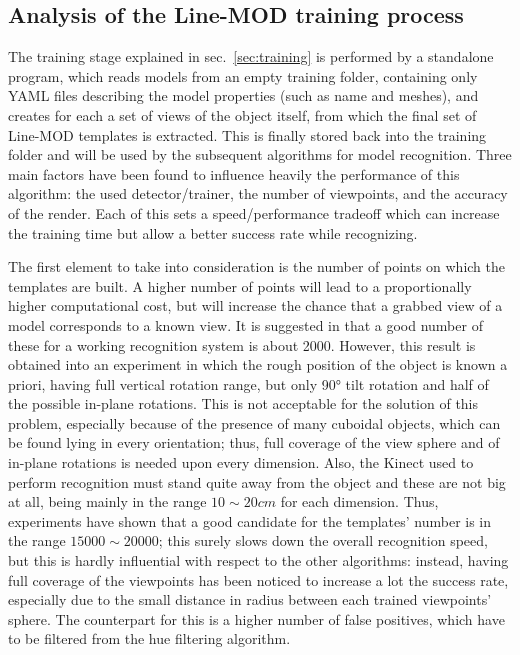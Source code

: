 \subsection{Analysis of the Line-MOD training process}
The training stage explained in sec.~\ref{sec:training} is performed
by a standalone program, which reads models from an empty training
folder, containing only YAML files describing the model properties
(such as name and meshes), and creates for each a set of views of the
object itself, from which the final set of Line-MOD templates is
extracted. This is finally stored back into the training folder and
will be used by the subsequent algorithms for model recognition.
Three main factors have been found to influence heavily the performance of this algorithm: the used
detector/trainer, the number of viewpoints, and the accuracy of the
render. Each of this sets a speed/performance tradeoff which can
increase the training time but allow a better success rate while
recognizing.

The first element to take into consideration is the number of points
on which the templates are built. A higher number of points will lead
to a proportionally higher computational cost, but will increase the
chance that a grabbed view of a model corresponds to a known view. It
is suggested in \cite{linemod-paper} that a good number of these
for a working recognition system is about 2000. However, this result
is obtained into an experiment in which the rough position of the
object is known a priori, having full vertical rotation range, but
only 90° tilt rotation and half of the possible in-plane
rotations. This is not acceptable for the solution of this problem,
especially because of the presence of many cuboidal objects, which can
be found lying in every orientation; thus, full coverage of the view
sphere and of in-plane rotations is needed upon every dimension. Also, the Kinect used to perform recognition must
stand quite away from the object and these are not big at all, being
mainly in the range $10\sim 20\unit{cm}$ for each dimension. Thus, experiments have shown
that a good candidate for the templates' number is in the range
$15000\sim 20000$; this surely slows down the overall recognition speed,
but this is hardly influential with respect to the other algorithms:
instead, having full coverage of the viewpoints has been noticed to
increase a lot the success rate, especially due to the small distance
in radius between each trained viewpoints' sphere. The counterpart for
this is a higher number of false positives, which have to be filtered
from the hue filtering algorithm.

